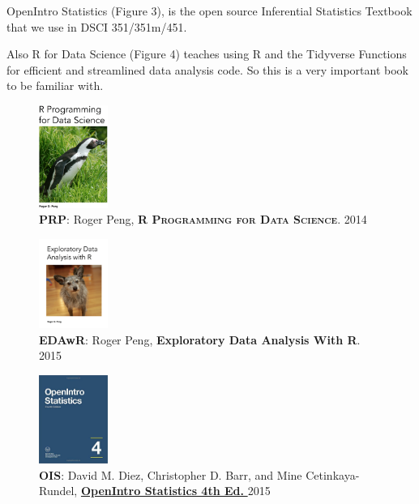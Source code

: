 \documentclass[10pt]{article} %
\begin{document}
    OpenIntro Statistics (Figure 3), is the open source Inferential Statistics Textbook that we use in DSCI 351/351m/451.

    Also R for Data Science (Figure 4) teaches using R and the Tidyverse Functions for efficient and streamlined data analysis code.
    So this is a very important book to be familiar with.

    \begin{figure}
      \centering
      \caption{{\bf PRP}: Roger Peng, {\bf \textsc{R Programming for Data Science}}. 2014 \cite{peng_r_2014}}
      \includegraphics[width=0.2\textwidth]{Peng-R-Programming} %
    \end{figure}

    \begin{figure}
    	\centering
    	\caption{{\bf EDAwR}: Roger Peng, {\bf Exploratory Data Analysis With R}. 2015 \cite{peng_exploratory_2015}}
    	\includegraphics[width=0.2\textwidth]{Peng-EDAwithR} %
    \end{figure}

    \begin{figure}
      \centering
      \caption{{\bf OIS}: David M. Diez, Christopher D. Barr, and Mine Cetinkaya-Rundel, \href{"https://www.openintro.org/stat/textbook.php"}{ {\bf OpenIntro Statistics 4th Ed.} } 2015 \cite{davidm.diezOpenIntroStatisticsFourth2019} }
      \includegraphics[width=0.2\textwidth]{OISv4} %
    \end{figure}
\end{document}

